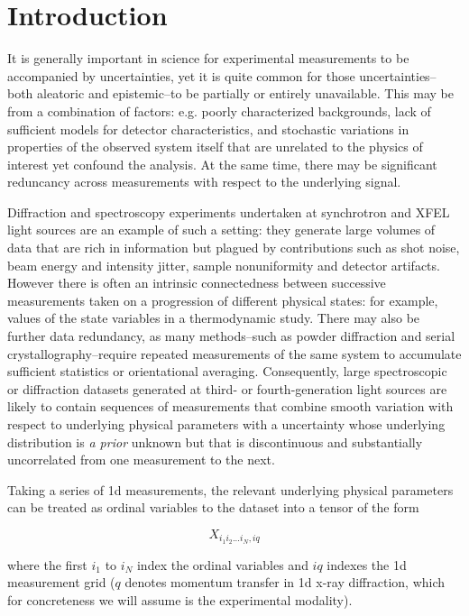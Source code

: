\documentclass[12pt]{iopart}
\begin{document}
\section{Introduction}
It is generally important in science for experimental measurements to be accompanied by uncertainties, yet it is quite common for those uncertainties--both aleatoric and epistemic--to be partially or entirely unavailable. This may be from a combination of factors: e.g. poorly characterized backgrounds, lack of sufficient models for detector characteristics, and stochastic variations in properties of the observed system itself that are unrelated to the physics of interest yet confound the analysis. At the same time, there may be significant reduncancy across measurements with respect to the underlying signal.

Diffraction and spectroscopy experiments undertaken at synchrotron and XFEL light sources are an example of such a setting: they generate large volumes of data that are rich in information but plagued by contributions such as shot noise, beam energy and intensity jitter, sample nonuniformity and detector artifacts. However there is often an intrinsic connectedness between successive measurements taken on a progression of different physical states: for example, values of the state variables in a thermodynamic study. There may also be further data redundancy, as many methods--such as powder diffraction and serial crystallography--require repeated measurements of the same system to accumulate sufficient statistics or orientational averaging. Consequently, large spectroscopic or diffraction datasets generated at third- or fourth-generation light sources are likely to contain sequences of measurements that combine smooth variation with respect to underlying physical parameters with a uncertainty whose underlying distribution is \emph{a prior} unknown but that is discontinuous and substantially uncorrelated from one measurement to the next. 

Taking a series of 1d measurements, the relevant underlying physical parameters can be treated as ordinal variables to the dataset into a tensor of the form 

\begin{equation}
X_{i_1i_2...i_N, iq}
\end{equation}

where the first $i_1$ to $i_N$ index the ordinal variables and $iq$ indexes the 1d measurement grid ($q$ denotes momentum transfer in 1d x-ray diffraction, which for concreteness we will assume is the experimental modality).
\end{document}
